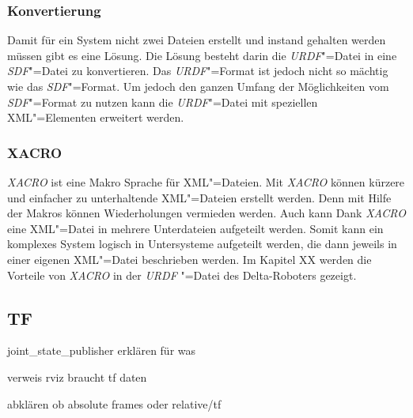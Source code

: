 \subsubsection{Konvertierung}
Damit für ein System nicht zwei Dateien erstellt und instand gehalten werden müssen gibt es eine Lösung.
Die Lösung besteht darin die \textit{URDF}"=Datei in eine \textit{SDF}"=Datei zu konvertieren.
Das \textit{URDF}"=Format ist jedoch nicht so mächtig wie das \textit{SDF}"=Format.
Um jedoch den ganzen Umfang der Möglichkeiten vom \textit{SDF}"=Format zu nutzen kann die \textit{URDF}"=Datei mit speziellen XML"=Elementen erweitert werden.

\subsubsection{XACRO}
\textit{XACRO} ist eine Makro Sprache für XML"=Dateien. %
Mit \textit{XACRO} können kürzere und einfacher zu unterhaltende XML"=Dateien erstellt werden.
Denn mit Hilfe der Makros können Wiederholungen vermieden werden.
Auch kann Dank \textit{XACRO} eine XML"=Datei in mehrere Unterdateien aufgeteilt werden.
Somit kann ein komplexes System logisch in Untersysteme aufgeteilt werden, die dann jeweils in einer eigenen XML"=Datei beschrieben werden. 
Im Kapitel XX werden die Vorteile von \textit{XACRO} in der \textit{URDF} "=Datei des Delta-Roboters gezeigt.

\subsection{TF}
joint_state_publisher erklären für was

verweis rviz braucht tf daten

abklären ob absolute frames oder relative/tf

